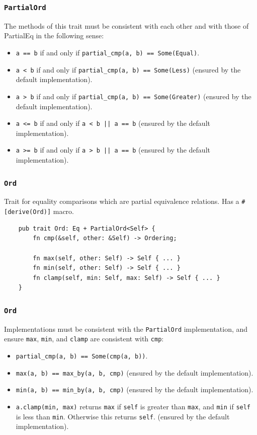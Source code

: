 \documentclass[aspectratio=1610,t]{beamer}
\begin{document}
\begin{frame}[fragile]
\frametitle{\texttt{PartialOrd}}
The methods of this trait must be consistent with each other and with those of PartialEq in the following sense:

\begin{itemize}
    \item \texttt{a == b} if and only if \texttt{partial\_cmp(a, b) == Some(Equal)}.
    \item \texttt{a < b} if and only if \texttt{partial\_cmp(a, b) == Some(Less)} (ensured by the default implementation).
    \item \texttt{a > b} if and only if \texttt{partial\_cmp(a, b) == Some(Greater)} (ensured by the default implementation).
    \item \texttt{a <= b} if and only if \texttt{a < b || a == b} (ensured by the default implementation).
    \item \texttt{a >= b} if and only if \texttt{a > b || a == b} (ensured by the default implementation).
\end{itemize}
\end{frame}


\begin{frame}[fragile]
\frametitle{\texttt{Ord}}
Trait for equality comparisons which are partial equivalence relations. Has a \texttt{\#[derive(Ord)]} macro.

\begin{verbatim}
    pub trait Ord: Eq + PartialOrd<Self> {
        fn cmp(&self, other: &Self) -> Ordering;

        fn max(self, other: Self) -> Self { ... }
        fn min(self, other: Self) -> Self { ... }
        fn clamp(self, min: Self, max: Self) -> Self { ... }
    }
\end{verbatim}
\end{frame}


\begin{frame}[fragile]
\frametitle{\texttt{Ord}}
Implementations must be consistent with the \texttt{PartialOrd} implementation, and ensure \texttt{max}, \texttt{min}, and \texttt{clamp} are consistent with \texttt{cmp}:

\begin{itemize}
    \item \texttt{partial\_cmp(a, b) == Some(cmp(a, b))}.
    \item \texttt{max(a, b) == max\_by(a, b, cmp)} (ensured by the default implementation).
    \item \texttt{min(a, b) == min\_by(a, b, cmp)} (ensured by the default implementation).
    \item \texttt{a.clamp(min, max)} returns \texttt{max} if \texttt{self} is greater than \texttt{max}, and \texttt{min} if \texttt{self} is less than \texttt{min}. Otherwise this returns \texttt{self}. (ensured by the default implementation).
\end{itemize}
\end{frame}
\end{document}
